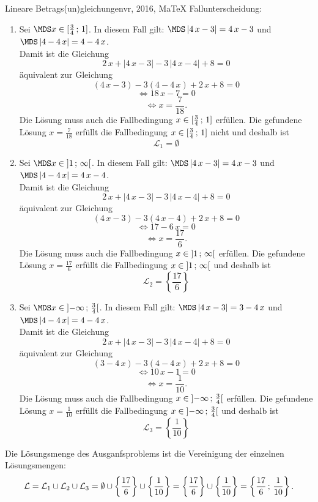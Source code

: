 \begin{MAufgabe}{Lineare Betrags(un)gleichungen}{vr, 2016, MaTeX}
 Fallunterscheidung: 

 \begin{enumerate} 
 \item Sei $ \MDS x\in[ \frac{3}{4} \, \MIntvlSep \, 1]$. 
 In diesem Fall gilt: 
  $ \MDS \left| 4\, x - 3\right|=4\, x - 3$ und $ \MDS \left| 4 - 4\, x\right|=4 - 4\, x$. \\ 
 Damit ist die Gleichung 
 $$ 
2\, x + \left|4\, x - 3\right| - 3\, \left|4\, x - 4\right| + 8= 0
$$
 \"aquivalent zur Gleichung
 $$ 
\left(4\, x - 3\right)-3\left( 4 - 4\, x\right)+2\, x+8= 0 
$$  
$$ 
 \Leftrightarrow 18\, x - 7= 0 
$$  
$$ \Leftrightarrow x = \frac{7}{18} . 
 $$ 
 Die L\"osung muss auch die Fallbedingung $x\in [ \frac{3}{4} \, ; \, 1] $ erf\"ullen. Die gefundene L\"osung $x=\frac{7}{18}$ erf\"ullt die Fallbedingung  $x\in [ \frac{3}{4} \, ; \, 1]$ nicht und deshalb ist  $$
 \mathcal{L}_{1}=\emptyset 
 $$ 
\item Sei $ \MDS x\in\MoIl  1 \, \MIntvlSep \, \infty\MoIr $. 
 In diesem Fall gilt: 
  $ \MDS \left| 4\, x - 3\right|=4\, x - 3$ und $ \MDS \left| 4 - 4\, x\right|=4\, x - 4$. \\ 
 Damit ist die Gleichung 
 $$ 
2\, x + \left|4\, x - 3\right| - 3\, \left|4\, x - 4\right| + 8= 0
$$
 \"aquivalent zur Gleichung
 $$ 
\left(4\, x - 3\right)-3\left( 4\, x - 4\right)+2\, x+8= 0 
$$  
$$ 
 \Leftrightarrow 17 - 6\, x= 0 
$$  
$$ \Leftrightarrow x = \frac{17}{6} . 
 $$ 
 Die L\"osung muss auch die Fallbedingung $x\in \mbox{}]\mathopen{}  1 \, ; \, \infty[\mbox{}  $ erf\"ullen. Die gefundene L\"osung $x=\frac{17}{6}$ erf\"ullt die Fallbedingung  $x\in \mbox{}]\mathopen{}  1 \, ; \, \infty[\mbox{} $ und deshalb ist  $$
 \mathcal{L}_{2}=\left\{\frac{17}{6}\right\}
 $$ 
\item Sei $ \MDS x\in\MoIl  -\infty \, \MIntvlSep \, \frac{3}{4}\MoIr $. 
 In diesem Fall gilt: 
  $ \MDS \left| 4\, x - 3\right|=3 - 4\, x$ und $ \MDS \left| 4 - 4\, x\right|=4 - 4\, x$. \\ 
 Damit ist die Gleichung 
 $$ 
2\, x + \left|4\, x - 3\right| - 3\, \left|4\, x - 4\right| + 8= 0
$$
 \"aquivalent zur Gleichung
 $$ 
\left(3 - 4\, x\right)-3\left( 4 - 4\, x\right)+2\, x+8= 0 
$$  
$$ 
 \Leftrightarrow 10\, x - 1= 0 
$$  
$$ \Leftrightarrow x = \frac{1}{10} . 
 $$ 
 Die L\"osung muss auch die Fallbedingung $x\in \mbox{}]\mathopen{}  -\infty \, ; \, \frac{3}{4}[\mbox{}  $ erf\"ullen. Die gefundene L\"osung $x=\frac{1}{10}$ erf\"ullt die Fallbedingung  $x\in \mbox{}]\mathopen{}  -\infty \, ; \, \frac{3}{4}[\mbox{} $ und deshalb ist  $$
 \mathcal{L}_{3}=\left\{\frac{1}{10}\right\}
 $$ 
 \end{enumerate} 
  Die L\"osungsmenge des Ausganfsproblems ist die Vereinigung der einzelnen L\"osungsmengen: 
$$ \mathcal{L} = \mathcal{L}_{1} \cup \mathcal{L}_{2} \cup \mathcal{L}_{3} 
 = \emptyset\cup \left\{\frac{17}{6}\right\}\cup \left\{\frac{1}{10}\right\} 
  =\left\{\frac{17}{6}\right\}\cup\left\{\frac{1}{10}\right\} 
  = \left\{\frac{17}{6}\, ; \,\frac{1}{10}\right\} 
 . $$ 
 

\end{MAufgabe}
